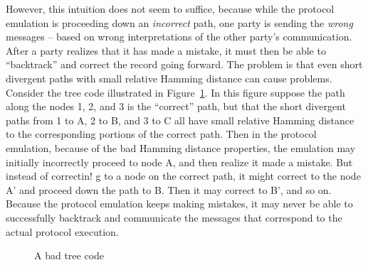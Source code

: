 \documentclass[ letterpaper, 11pt]{article}
\begin{document}
However, this intuition does not seem to suffice, because while the protocol emulation is proceeding down an \emph{incorrect} path, one party is sending the \emph{wrong} messages -- based on wrong interpretations of the other party's communication.  After a party realizes that it has made a mistake, it must then be able to ``backtrack'' and correct the record going forward.  The problem is that even short divergent paths with small relative Hamming distance can cause problems.  Consider the tree code illustrated in Figure~\ref{fig:bad}.  In this figure suppose the path along the nodes 1, 2, and 3 is the ``correct'' path, but that the short divergent paths from 1 to A, 2 to B, and 3 to C all have small relative Hamming distance to the corresponding portions of the correct path.  Then in the protocol emulation, because of the bad Hamming distance properties, the emulation may initially incorrectly proceed to node A, and then realize it made a mistake.  But instead of correctin!
 g to a node on the correct path, it might correct to the node A' and proceed down the path to B.  Then it may correct to B', and so on.  Because the protocol emulation keeps making mistakes, it may never be able to successfully backtrack and communicate the messages that correspond to the actual protocol execution.
\begin{figure}[htb]
\begin{center}

\end{center}
\caption{A bad tree code}
\label{fig:bad}
\end{figure}
\end{document}
